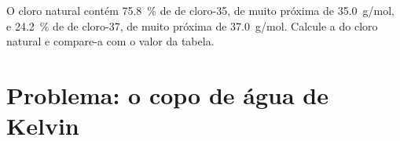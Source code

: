 \begin{exercise}[$\star\star\star$]\label{exo:g10:the-mole:15}
O cloro natural contém \qty{75.8}{\percent} de  de cloro-35, de
 muito próxima de \qty{35.0}{g/mol}, e \qty{24.2}{\percent}
de  de cloro-37, de  muito próxima de
\qty{37.0}{g/mol}. Calcule a  do cloro natural e
compare-a com o valor da tabela.
\end{exercise}

\section{Problema: o copo de água de Kelvin}

